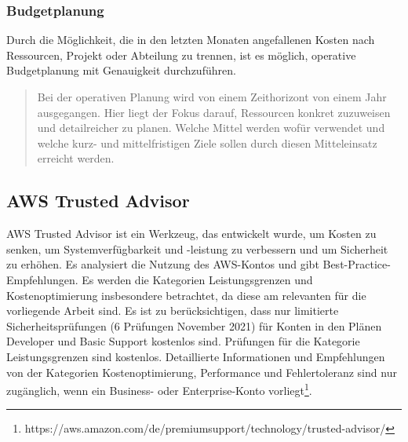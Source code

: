 \subsubsection*{Budgetplanung}
Durch die Möglichkeit, die in den letzten Monaten angefallenen Kosten nach Ressourcen, Projekt oder Abteilung zu trennen, ist es möglich, operative Budgetplanung mit Genauigkeit durchzuführen. 
\begin{quote}
Bei der operativen Planung wird von einem Zeithorizont von einem Jahr ausgegangen. Hier liegt der Fokus darauf, Ressourcen konkret zuzuweisen und detailreicher zu planen. Welche Mittel werden wofür verwendet und welche kurz- und mittelfristigen Ziele sollen durch diesen Mitteleinsatz erreicht werden.\cite{BUD1}
\end{quote}


\subsection{AWS Trusted Advisor}

AWS Trusted Advisor ist ein Werkzeug, das entwickelt wurde, um Kosten zu senken, um Systemverfügbarkeit und -leistung zu verbessern und um Sicherheit zu erhöhen. Es analysiert die Nutzung des AWS-Kontos und gibt Best-Practice-Empfehlungen. Es werden die Kategorien Leistungsgrenzen und Kostenoptimierung insbesondere betrachtet, da diese am relevanten für die vorliegende Arbeit sind. Es ist zu berücksichtigen, dass nur limitierte Sicherheitsprüfungen (6 Prüfungen November 2021) für Konten in den Plänen Developer und Basic Support kostenlos sind. Prüfungen für die Kategorie Leistungsgrenzen sind kostenlos. Detaillierte Informationen und Empfehlungen von der Kategorien Kostenoptimierung, Performance und Fehlertoleranz sind nur zugänglich, wenn ein Business- oder Enterprise-Konto vorliegt\footnote{https://aws.amazon.com/de/premiumsupport/technology/trusted-advisor/}. \\


